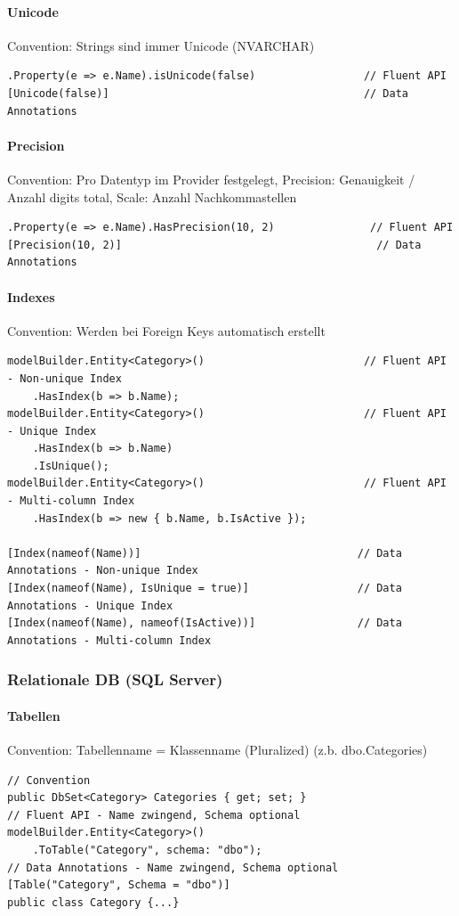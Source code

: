 \documentclass[
a4paper,
oneside,
10pt,
fleqn,
headsepline,
toc=listofnumbered, 
bibliography=totocnumbered]{scrartcl}
\begin{document}
\paragraph{Unicode}
Convention: Strings sind immer Unicode (NVARCHAR)
\begin{lstlisting}
.Property(e => e.Name).isUnicode(false)                 // Fluent API
[Unicode(false)]                                        // Data Annotations
\end{lstlisting}

\paragraph{Precision}
Convention: Pro Datentyp im Provider festgelegt, Precision: Genauigkeit / Anzahl digits total, Scale: Anzahl Nachkommastellen
\begin{lstlisting}
.Property(e => e.Name).HasPrecision(10, 2)               // Fluent API
[Precision(10, 2)]                                        // Data Annotations
\end{lstlisting}

\paragraph{Indexes}
Convention: Werden bei Foreign Keys automatisch erstellt
\begin{lstlisting} 
modelBuilder.Entity<Category>()                         // Fluent API - Non-unique Index
    .HasIndex(b => b.Name);
modelBuilder.Entity<Category>()                         // Fluent API - Unique Index
    .HasIndex(b => b.Name)
    .IsUnique();
modelBuilder.Entity<Category>()                         // Fluent API - Multi-column Index
    .HasIndex(b => new { b.Name, b.IsActive });

[Index(nameof(Name))]                                  // Data Annotations - Non-unique Index
[Index(nameof(Name), IsUnique = true)]                 // Data Annotations - Unique Index
[Index(nameof(Name), nameof(IsActive))]                // Data Annotations - Multi-column Index
\end{lstlisting}

\subsubsection{Relationale DB (SQL Server)}
\paragraph{Tabellen} Convention: Tabellenname = Klassenname (Pluralized) (z.b. dbo.Categories)
\begin{lstlisting}
// Convention
public DbSet<Category> Categories { get; set; }
// Fluent API - Name zwingend, Schema optional
modelBuilder.Entity<Category>()                         
    .ToTable("Category", schema: "dbo");
// Data Annotations - Name zwingend, Schema optional
[Table("Category", Schema = "dbo")]                     
public class Category {...}
\end{lstlisting}
\end{document}
